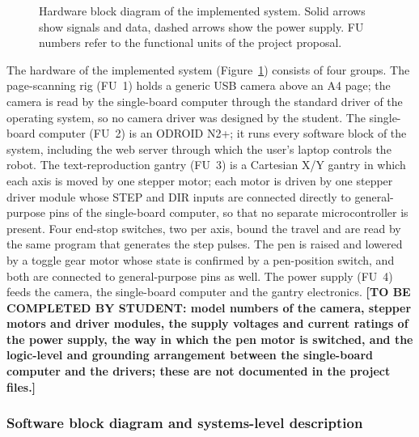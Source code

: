\begin{figure}[h]
\caption{Hardware block diagram of the implemented system. Solid arrows show signals and data, dashed arrows show the power supply. FU numbers refer to the functional units of the project proposal.}
\label{fig:des-hw}
\end{figure}

The hardware of the implemented system (Figure~\ref{fig:des-hw}) consists of four groups.
The page-scanning rig (FU~1) holds a generic USB camera above an A4 page; the camera is read by the single-board computer through the standard driver of the operating system, so no camera driver was designed by the student.
The single-board computer (FU~2) is an ODROID N2+; it runs every software block of the system, including the web server through which the user's laptop controls the robot.
The text-reproduction gantry (FU~3) is a Cartesian X/Y gantry in which each axis is moved by one stepper motor; each motor is driven by one stepper driver module whose STEP and DIR inputs are connected directly to general-purpose pins of the single-board computer, so that no separate microcontroller is present.
Four end-stop switches, two per axis, bound the travel and are read by the same program that generates the step pulses.
The pen is raised and lowered by a toggle gear motor whose state is confirmed by a pen-position switch, and both are connected to general-purpose pins as well.
The power supply (FU~4) feeds the camera, the single-board computer and the gantry electronics.
\textbf{[TO BE COMPLETED BY STUDENT: model numbers of the camera, stepper motors and driver modules, the supply voltages and current ratings of the power supply, the way in which the pen motor is switched, and the logic-level and grounding arrangement between the single-board computer and the drivers; these are not documented in the project files.]}

\subsubsection{Software block diagram and systems-level description}

